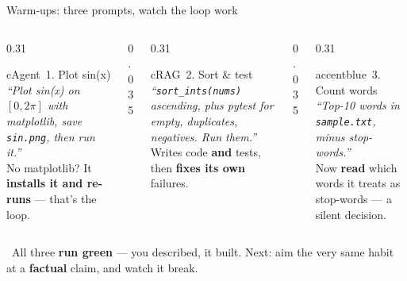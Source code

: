 \begin{frame}{Warm-ups: three prompts, watch the loop work}
  \begin{columns}[t, totalwidth=\textwidth]
    \begin{column}{0.31\textwidth}
      \begin{featbox}{cAgent}{\faChartLine\ 1. Plot sin(x)}
        \scriptsize \emph{``Plot sin(x) on $[0,2\pi]$ with matplotlib, save
        \texttt{sin.png}, then run it.''}
        \\[4pt]{\color{midgray}No matplotlib? It \textbf{installs it and re-runs} --- that's the loop.}
      \end{featbox}
    \end{column}
    \begin{column}{0.035\textwidth}\end{column}
    \begin{column}{0.31\textwidth}
      \begin{featbox}{cRAG}{\faVial\ 2. Sort \& test}
        \scriptsize \emph{``\texttt{sort\_ints(nums)} ascending, plus pytest for empty,
        duplicates, negatives. Run them.''}
        \\[4pt]{\color{midgray}Writes code \textbf{and} tests, then \textbf{fixes its own} failures.}
      \end{featbox}
    \end{column}
    \begin{column}{0.035\textwidth}\end{column}
    \begin{column}{0.31\textwidth}
      \begin{featbox}{accentblue}{\faAlignLeft\ 3. Count words}
        \scriptsize \emph{``Top-10 words in \texttt{sample.txt}, minus stop-words.''}
        \\[4pt]{\color{midgray}Now \textbf{read} which words it treats as stop-words --- a silent decision.}
      \end{featbox}
    \end{column}
  \end{columns}
  \vspace{10pt}
  \begin{calloutbox}[accentteal]
    \small\faCheckCircle\ All three \textbf{run green} --- you described, it built. Next:
    aim the very same habit at a \textbf{factual} claim, and watch it break.
  \end{calloutbox}
\end{frame}

